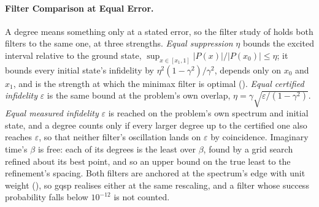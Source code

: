 \paragraph{Filter Comparison at Equal Error.}
\label{app:filter-study}
A degree means something only at a stated error, so the filter study of  holds both filters to the same one, at three strengths. \emph{Equal suppression} $\eta$ bounds the excited interval relative to the ground state, $\sup_{x\in[x_1,1]}|P(x)|/|P(x_0)|\le\eta$; it bounds every initial state's infidelity by $\eta^2(1-\gamma^2)/\gamma^2$, depends only on $x_0$ and $x_1$, and is the strength at which the minimax filter is optimal (). \emph{Equal certified infidelity} $\varepsilon$ is the same bound at the problem's own overlap, $\eta=\gamma\sqrt{\varepsilon/(1-\gamma^2)}$. \emph{Equal measured infidelity} $\varepsilon$ is reached on the problem's own spectrum and initial state, and a degree counts only if every larger degree up to the certified one also reaches $\varepsilon$, so that neither filter's oscillation lands on $\varepsilon$ by coincidence. Imaginary time's $\beta$ is free: each of its degrees is the least over $\beta$, found by a grid search refined about its best point, and so an upper bound on the true least to the refinement's spacing. Both filters are anchored at the spectrum's edge with unit weight (), so \gls{gqsp} realises either at the same rescaling, and a filter whose success probability falls below $10^{-12}$ is not counted.

